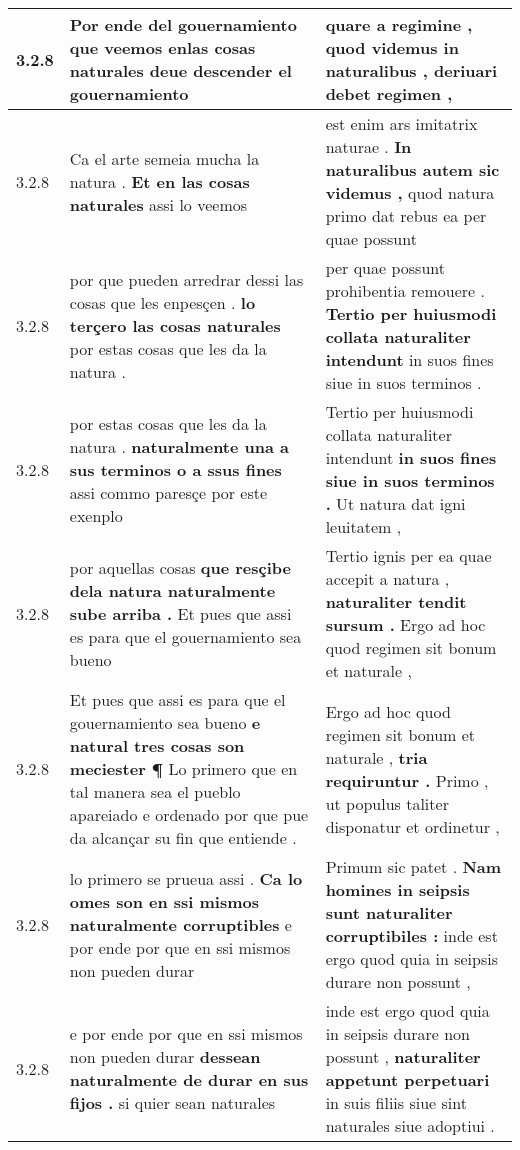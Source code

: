 \begin{tabular}{|p{1cm}|p{6.5cm}|p{6.5cm}|}
3.2.8 & Por ende del gouernamiento \textbf{ que veemos enlas cosas naturales } deue descender el gouernamiento & quare a regimine , \textbf{ quod videmus in naturalibus , } deriuari debet regimen , \\\hline
3.2.8 & Ca el arte semeia mucha la natura . \textbf{ Et en las cosas naturales } assi lo veemos & est enim ars imitatrix naturae . \textbf{ In naturalibus autem sic videmus , } quod natura primo dat rebus ea per quae possunt \\\hline
3.2.8 & por que pueden arredrar dessi las cosas que les enpesçen . \textbf{ lo terçero las cosas naturales } por estas cosas que les da la natura . & per quae possunt prohibentia remouere . \textbf{ Tertio per huiusmodi collata naturaliter intendunt } in suos fines siue in suos terminos . \\\hline
3.2.8 & por estas cosas que les da la natura . \textbf{ naturalmente una a sus terminos o a ssus fines } assi commo paresçe por este exenplo & Tertio per huiusmodi collata naturaliter intendunt \textbf{ in suos fines siue in suos terminos . } Ut natura dat igni leuitatem , \\\hline
3.2.8 & por aquellas cosas \textbf{ que resçibe dela natura naturalmente sube arriba . } Et pues que assi es para que el gouernamiento sea bueno & Tertio ignis per ea quae accepit a natura , \textbf{ naturaliter tendit sursum . } Ergo ad hoc quod regimen sit bonum et naturale , \\\hline
3.2.8 & Et pues que assi es para que el gouernamiento sea bueno \textbf{ e natural tres cosas son meciester ¶ } Lo primero que en tal manera sea el pueblo apareiado e ordenado por que pue da alcançar su fin que entiende . & Ergo ad hoc quod regimen sit bonum et naturale , \textbf{ tria requiruntur . } Primo , ut populus taliter disponatur et ordinetur , \\\hline
3.2.8 & lo primero se prueua assi . \textbf{ Ca lo omes son en ssi mismos naturalmente corruptibles } e por ende por que en ssi mismos non pueden durar & Primum sic patet . \textbf{ Nam homines in seipsis sunt naturaliter corruptibiles : } inde est ergo quod quia in seipsis durare non possunt , \\\hline
3.2.8 & e por ende por que en ssi mismos non pueden durar \textbf{ dessean naturalmente de durar en sus fijos . } si quier sean naturales & inde est ergo quod quia in seipsis durare non possunt , \textbf{ naturaliter appetunt perpetuari } in suis filiis siue sint naturales siue adoptiui . \\\hline

\end{tabular}
